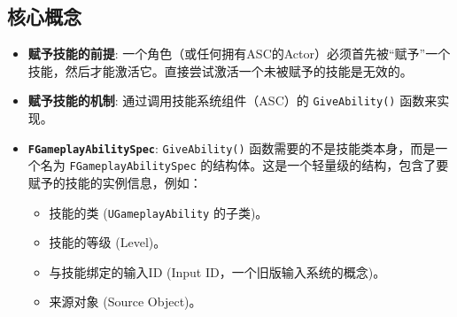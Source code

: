 \documentclass[math,code,10pt,CJKmath]{amznotes}
\newcommand{\il}[1]{\texttt{#1}}%
\begin{document}
\subsection{核心概念}
\begin{itemize}
    \item \textbf{赋予技能的前提}: 一个角色（或任何拥有ASC的Actor）必须首先被“赋予”一个技能，然后才能激活它。直接尝试激活一个未被赋予的技能是无效的。
    \item \textbf{赋予技能的机制}: 通过调用技能系统组件（ASC）的 \texttt{GiveAbility()} 函数来实现。
    \item \textbf{\texttt{FGameplayAbilitySpec}}: \texttt{GiveAbility()} 函数需要的不是技能类本身，而是一个名为 \il{FGameplayAbilitySpec} 的结构体。这是一个轻量级的结构，包含了要赋予的技能的实例信息，例如：
    \begin{itemize}
        \item 技能的类 (\texttt{UGameplayAbility} 的子类)。
        \item 技能的等级 (Level)。
        \item 与技能绑定的输入ID (Input ID，一个旧版输入系统的概念)。
        \item 来源对象 (Source Object)。
    \end{itemize}
\end{itemize}
\end{document}
